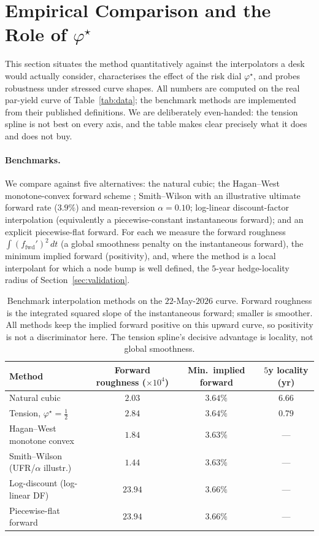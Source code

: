 \documentclass[]{interact}
\theoremstyle{plain}
\begin{document}
\section{Empirical Comparison and the Role of $\varphi^\star$}\label{sec:empirical}
This section situates the method quantitatively against the interpolators a desk would actually
consider, characterises the effect of the risk dial $\varphi^\star$, and probes robustness under
stressed curve shapes. All numbers are computed on the real par-yield curve of
Table~\ref{tab:data}; the benchmark methods are implemented from their published definitions.
We are deliberately even-handed: the tension spline is not best on every axis, and the table
makes clear precisely what it does and does not buy.

\paragraph{Benchmarks.} We compare against five alternatives: the natural cubic; the Hagan--West
monotone-convex forward scheme \cite{Hagan}; Smith--Wilson with an illustrative ultimate forward
rate ($3.9\%$) and mean-reversion $\alpha=0.10$; log-linear discount-factor interpolation
(equivalently a piecewise-constant instantaneous forward); and an explicit piecewise-flat forward.
For each we measure the forward roughness $\int (f_{\mathrm{fwd}}')^2\,dt$ (a global smoothness
penalty on the instantaneous forward), the minimum implied forward (positivity), and, where the
method is a local interpolant for which a node bump is well defined, the $5$-year hedge-locality
radius of Section~\ref{sec:validation}.

\begin{table}[h]\centering\small
\begin{tabular}{lccc}
\hline
Method & Forward roughness ($\times10^{4}$) & Min.\ implied forward & $5$y locality (yr)\\
\hline
Natural cubic                       & $2.03$  & $3.64\%$ & $6.66$\\
Tension, $\varphi^\star=\tfrac12$   & $2.84$  & $3.64\%$ & $\mathbf{0.79}$\\
Hagan--West monotone convex         & $1.84$  & $3.63\%$ & ---\\
Smith--Wilson (UFR/$\alpha$ illustr.)& $1.44$ & $3.63\%$ & ---\\
Log-discount (log-linear DF)        & $23.94$ & $3.66\%$ & ---\\
Piecewise-flat forward              & $23.94$ & $3.66\%$ & ---\\
\hline
\end{tabular}
\caption{Benchmark interpolation methods on the $22$-May-$2026$ curve. Forward roughness is the
integrated squared slope of the instantaneous forward; smaller is smoother. All methods keep the
implied forward positive on this upward curve, so positivity is not a discriminator here. The
tension spline's decisive advantage is locality, not global smoothness.}\label{tab:bench}
\end{table}
\end{document}
